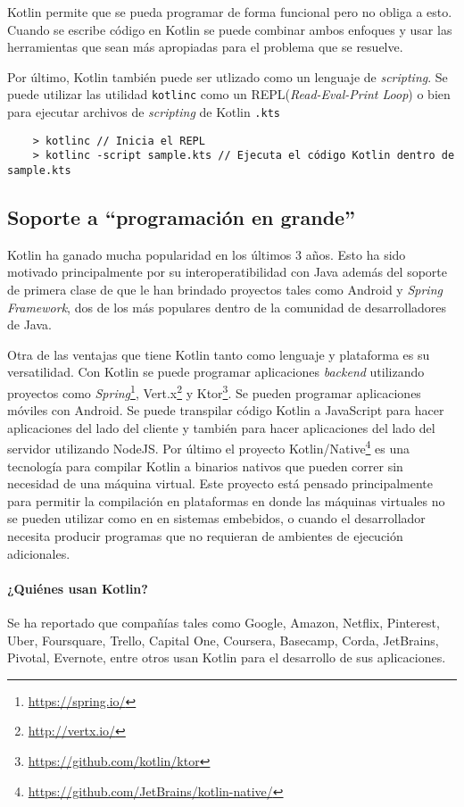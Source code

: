 Kotlin permite que se pueda programar de forma funcional pero no obliga a esto. Cuando se escribe código en Kotlin se puede combinar ambos enfoques y usar las herramientas que sean más apropiadas para el problema que se resuelve.

Por último, Kotlin también puede ser utlizado como un lenguaje de \emph{scripting}. Se puede utilizar las utilidad \texttt{kotlinc} como un REPL(\emph{Read-Eval-Print Loop}) o bien para ejecutar archivos de \emph{scripting} de Kotlin \texttt{.kts}
\begin{verbatim}
    > kotlinc // Inicia el REPL
    > kotlinc -script sample.kts // Ejecuta el código Kotlin dentro de sample.kts
\end{verbatim}

\subsection{Soporte a ``programación en grande''}
Kotlin ha ganado mucha popularidad en los últimos 3 años. Esto ha sido motivado principalmente por su interoperatibilidad con Java además del soporte de primera clase de que le han brindado proyectos tales como Android y \emph{Spring Framework}, dos de los más populares dentro de la comunidad de desarrolladores de Java.

Otra de las ventajas que tiene Kotlin tanto como lenguaje y plataforma es su versatilidad. Con Kotlin se puede programar aplicaciones \emph{backend} utilizando proyectos como \emph{Spring}\footnote{\url{https://spring.io/}}, Vert.x\footnote{\url{http://vertx.io/}} y Ktor\footnote{\url{https://github.com/kotlin/ktor}}. Se pueden programar aplicaciones móviles con Android. Se puede transpilar código Kotlin a JavaScript para hacer aplicaciones del lado del cliente y también para hacer aplicaciones del lado del servidor utilizando NodeJS. Por último el proyecto Kotlin/Native\footnote{\url{https://github.com/JetBrains/kotlin-native/}} es una tecnología para compilar Kotlin a binarios nativos que pueden correr sin necesidad de una máquina virtual. Este proyecto está pensado principalmente para permitir la compilación en plataformas en donde las máquinas virtuales no se pueden utilizar como en en sistemas embebidos, o cuando el desarrollador necesita producir programas que no requieran de ambientes de ejecución adicionales.

\paragraph{¿Quiénes usan Kotlin?} Se ha reportado que compañías tales como Google, Amazon, Netflix, Pinterest, Uber, Foursquare, Trello, Capital One, Coursera, Basecamp, Corda, JetBrains, Pivotal, Evernote, entre otros usan Kotlin para el desarrollo de sus aplicaciones.

